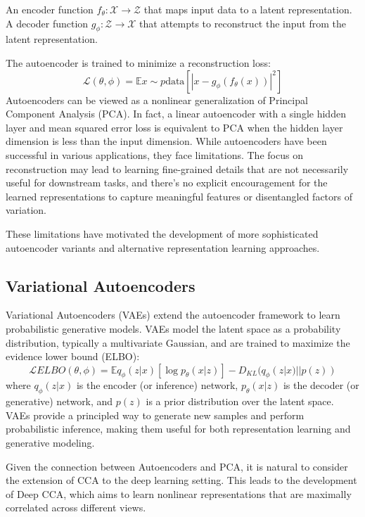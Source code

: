 An encoder function $f_{\theta}: \mathcal{X} \to \mathcal{Z}$ that maps input data to a latent representation.
A decoder function $g_{\phi}: \mathcal{Z} \to \mathcal{X}$ that attempts to reconstruct the input from the latent representation.

The autoencoder is trained to minimize a reconstruction loss:
\begin{equation}
\mathcal{L}(\theta, \phi) = \mathbb{E}{x \sim p{\text{data}}}[|x - g_{\phi}(f_{\theta}(x))|^2]
\end{equation}
Autoencoders can be viewed as a nonlinear generalization of Principal Component Analysis (PCA). In fact, a linear autoencoder with a single hidden layer and mean squared error loss is equivalent to PCA when the hidden layer dimension is less than the input dimension.
While autoencoders have been successful in various applications, they face limitations. The focus on reconstruction may lead to learning fine-grained details that are not necessarily useful for downstream tasks, and there's no explicit encouragement for the learned representations to capture meaningful features or disentangled factors of variation.

These limitations have motivated the development of more sophisticated autoencoder variants and alternative representation learning approaches.
\subsection{Variational Autoencoders}
Variational Autoencoders (VAEs) \citep{kingma2013auto} extend the autoencoder framework to learn probabilistic generative models. VAEs model the latent space as a probability distribution, typically a multivariate Gaussian, and are trained to maximize the evidence lower bound (ELBO):
\begin{equation}
\mathcal{L}{ELBO}(\theta, \phi) = \mathbb{E}{q_{\phi}(z|x)}[\log p_{\theta}(x|z)] - D_{KL}(q_{\phi}(z|x) || p(z))
\end{equation}
where $q_{\phi}(z|x)$ is the encoder (or inference) network, $p_{\theta}(x|z)$ is the decoder (or generative) network, and $p(z)$ is a prior distribution over the latent space.
VAEs provide a principled way to generate new samples and perform probabilistic inference, making them useful for both representation learning and generative modeling.

Given the connection between Autoencoders and PCA, it is natural to consider the extension of CCA to the deep learning setting. This leads to the development of Deep CCA, which aims to learn nonlinear representations that are maximally correlated across different views.

